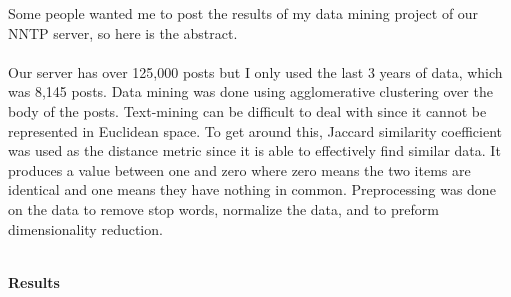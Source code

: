 \documentclass[9pt]{extarticle} %
\begin{document}
\pagebreak

\hypertarget{secondnews}{} 

Some people wanted me to post the results of my data mining project of our NNTP server, so here is the abstract.  \\
\\
Our server has over 125,000 posts but I only used the last 3 years of data, which was 8,145 posts. Data mining was done using agglomerative clustering over the body of the posts. Text-mining can be difficult to deal with since it cannot be represented in Euclidean space. To get around this, Jaccard similarity coefficient was used as the distance metric since it is able to effectively find similar data. It produces a   value between one and zero where zero means the two items are identical and one means they have nothing in common. Preprocessing was done on the data to remove stop words, normalize the data, and to preform dimensionality reduction. \\
\\
\centerline{\textbf{Results}}
\end{document}
